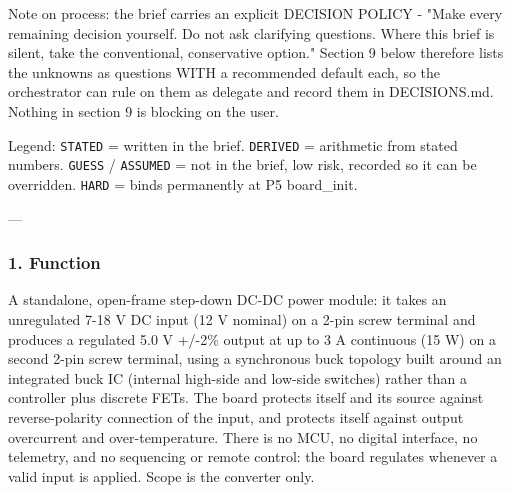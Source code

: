 \documentclass[11pt,a4paper]{article}
\begin{document}
Note on process: the brief carries an explicit DECISION POLICY - "Make every remaining decision yourself. Do not ask clarifying questions. Where this brief is silent, take the conventional, conservative option." Section 9 below therefore lists the unknowns as questions WITH a recommended default each, so the orchestrator can rule on them as delegate and record them in DECISIONS.md. Nothing in section 9 is blocking on the user.

Legend: \texttt{STATED} = written in the brief. \texttt{DERIVED} = arithmetic from stated numbers. \texttt{GUESS} / \texttt{ASSUMED} = not in the brief, low risk, recorded so it can be overridden. \texttt{HARD} = binds permanently at P5 board\_init.

---

\subsubsection*{1. Function}
A standalone, open-frame step-down DC-DC power module: it takes an unregulated 7-18 V DC input (12 V nominal) on a 2-pin screw terminal and produces a regulated 5.0 V +/-2\% output at up to 3 A continuous (15 W) on a second 2-pin screw terminal, using a synchronous buck topology built around an integrated buck IC (internal high-side and low-side switches) rather than a controller plus discrete FETs. The board protects itself and its source against reverse-polarity connection of the input, and protects itself against output overcurrent and over-temperature. There is no MCU, no digital interface, no telemetry, and no sequencing or remote control: the board regulates whenever a valid input is applied. Scope is the converter only.
\end{document}
